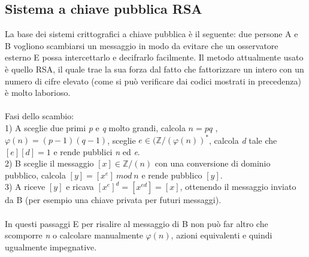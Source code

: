 \documentclass{article}
\begin{document}
\subsection{Sistema a chiave pubblica RSA}
La base dei sistemi crittografici a chiave pubblica è il seguente: due persone A e B vogliono scambiarsi un messaggio in modo da evitare che un osservatore esterno E possa intercettarlo e decifrarlo facilmente. Il metodo attualmente usato è quello RSA, il quale trae la sua forza dal fatto che fattorizzare un intero con un numero di cifre elevato (come si può verificare dai codici mostrati in precedenza) è molto laborioso.\\ \\ Fasi dello scambio:\\
1) A sceglie due primi \textit{p} e \textit{q} molto grandi, calcola \(n=pq\) , \(\varphi(n)=(p-1)(q-1)\), sceglie \(e\in(\mathbb{Z}/(\varphi(n))^*\), calcola \textit{d} tale che \([e][d]=1\) e rende pubblici \textit{n} ed \textit{e}.\\
2) B sceglie il messaggio \([x]\in\mathbb{Z}/(n)\) con una conversione di dominio pubblico, calcola \([y]=[x^e]\ mod\ n\) e rende pubblico \([y]\).\\
3) A riceve \([y]\) e ricava \([x^e]^d=[x^{ed}]=[x]\), ottenendo il messaggio inviato da B (per esempio una chiave privata per futuri messaggi).\\ \\
In questi passaggi E per risalire al messaggio di B non può far altro che scomporre \textit{n} o calcolare manualmente \(\varphi(n)\), azioni equivalenti e quindi ugualmente impegnative.
\end{document}
